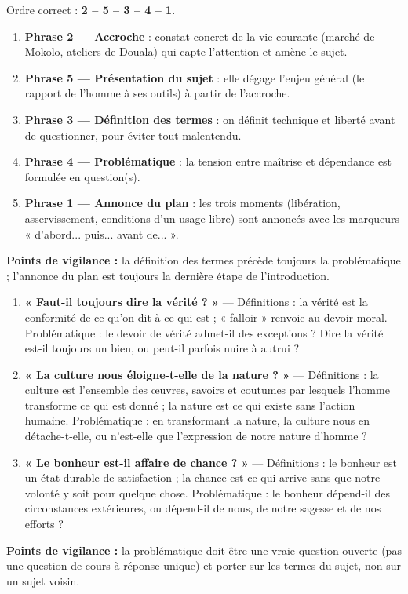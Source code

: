 \documentclass[11pt]{article}
\newcommand{\cle}[1]{{\popxbold\color{popdark}#1}}
\begin{document}
\begin{corrige}
Ordre correct : \textbf{2 -- 5 -- 3 -- 4 -- 1}.
\begin{enumerate}
\item \textbf{Phrase 2 — Accroche} : constat concret de la vie courante (marché de Mokolo, ateliers de Douala) qui capte l'attention et amène le sujet.
\item \textbf{Phrase 5 — Présentation du sujet} : elle dégage l'enjeu général (le rapport de l'homme à ses outils) à partir de l'accroche.
\item \textbf{Phrase 3 — Définition des termes} : on définit \cle{technique} et \cle{liberté} avant de questionner, pour éviter tout malentendu.
\item \textbf{Phrase 4 — Problématique} : la tension entre maîtrise et dépendance est formulée en question(s).
\item \textbf{Phrase 1 — Annonce du plan} : les trois moments (libération, asservissement, conditions d'un usage libre) sont annoncés avec les marqueurs « d'abord... puis... avant de... ».
\end{enumerate}
\textbf{Points de vigilance :} la définition des termes précède toujours la problématique ; l'annonce du plan est toujours la dernière étape de l'introduction.
\end{corrige}

\begin{corrige}
\begin{enumerate}
\item \textbf{« Faut-il toujours dire la vérité ? »} — Définitions : la \cle{vérité} est la conformité de ce qu'on dit à ce qui est ; « falloir » renvoie au \cle{devoir} moral. Problématique : le devoir de vérité admet-il des exceptions ? Dire la vérité est-il toujours un bien, ou peut-il parfois nuire à autrui ?
\item \textbf{« La culture nous éloigne-t-elle de la nature ? »} — Définitions : la \cle{culture} est l'ensemble des œuvres, savoirs et coutumes par lesquels l'homme transforme ce qui est donné ; la \cle{nature} est ce qui existe sans l'action humaine. Problématique : en transformant la nature, la culture nous en détache-t-elle, ou n'est-elle que l'expression de notre nature d'homme ?
\item \textbf{« Le bonheur est-il affaire de chance ? »} — Définitions : le \cle{bonheur} est un état durable de satisfaction ; la \cle{chance} est ce qui arrive sans que notre volonté y soit pour quelque chose. Problématique : le bonheur dépend-il des circonstances extérieures, ou dépend-il de nous, de notre sagesse et de nos efforts ?
\end{enumerate}
\textbf{Points de vigilance :} la problématique doit être une vraie question ouverte (pas une question de cours à réponse unique) et porter sur les termes du sujet, non sur un sujet voisin.
\end{corrige}
\end{document}
